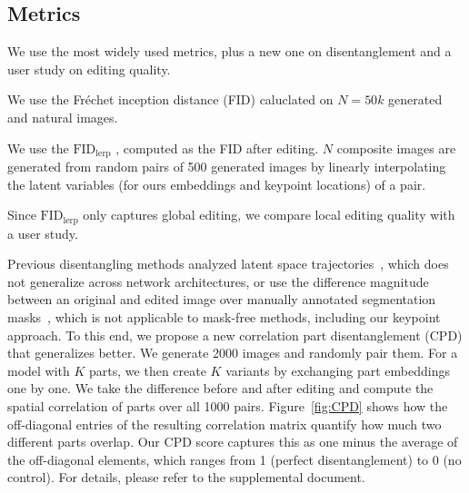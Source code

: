 \documentclass[10pt, conference, compsocconf]{IEEEtran}
\begin{document}
\subsection{Metrics} We use the most widely used metrics, plus a new one on disentanglement and a user study on editing quality.

 We use the Fr\'{e}chet inception distance (FID) \cite{heusel2017gans} 
caluclated on $N=50k$ generated and natural images.

 We use the $\text{FID}_\text{lerp}$ \cite{kim2021exploiting}, computed as the FID after editing. $N$ composite images are generated from random pairs of 500 generated images by linearly interpolating the latent variables (for ours embeddings and keypoint locations) of a pair. 

Since $\text{FID}_\text{lerp}$ only captures global editing, we compare local editing quality with a user study.

 \label{sec:cpd} Previous disentangling methods analyzed latent space trajectories~\cite{karras2019style}, which does not generalize across network architectures, or use the difference magnitude between an original and edited image over manually annotated segmentation masks~\cite{collins2020editing}, which is not applicable to mask-free methods, including our keypoint approach. To this end, we propose a new correlation part disentanglement (CPD) that generalizes better. We generate 2000 images and randomly pair them. For a model with $K$ parts, we then create $K$ variants by exchanging part embeddings one by one. We take the difference before and after editing and compute the spatial correlation of parts over all 1000 pairs. 
Figure~\ref{fig:CPD} shows how the off-diagonal entries of the resulting correlation matrix quantify how much two different parts overlap.
Our CPD score captures this as one minus the average of the off-diagonal elements, which ranges from 1 (perfect disentanglement) to 0 (no control). For details, please refer to the supplemental document.
\end{document}
